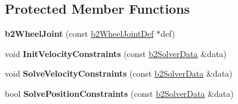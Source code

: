 \subsection*{Protected Member Functions}
\begin{DoxyCompactItemize}
\item 
\hypertarget{classb2_wheel_joint_a9c8bbb1068ddb46d074fe91802dd6a39}{{\bfseries b2\-Wheel\-Joint} (const \hyperlink{structb2_wheel_joint_def}{b2\-Wheel\-Joint\-Def} $\ast$def)}\label{classb2_wheel_joint_a9c8bbb1068ddb46d074fe91802dd6a39}

\item 
\hypertarget{classb2_wheel_joint_af3fc35c89dc253661297d69fe4a00a97}{void {\bfseries Init\-Velocity\-Constraints} (const \hyperlink{structb2_solver_data}{b2\-Solver\-Data} \&data)}\label{classb2_wheel_joint_af3fc35c89dc253661297d69fe4a00a97}

\item 
\hypertarget{classb2_wheel_joint_a09283ebe01298e6a2e897ca409b70289}{void {\bfseries Solve\-Velocity\-Constraints} (const \hyperlink{structb2_solver_data}{b2\-Solver\-Data} \&data)}\label{classb2_wheel_joint_a09283ebe01298e6a2e897ca409b70289}

\item 
\hypertarget{classb2_wheel_joint_ae14faaa2cd91bdea615e86c0dd2ccc97}{bool {\bfseries Solve\-Position\-Constraints} (const \hyperlink{structb2_solver_data}{b2\-Solver\-Data} \&data)}\label{classb2_wheel_joint_ae14faaa2cd91bdea615e86c0dd2ccc97}

\end{DoxyCompactItemize}
